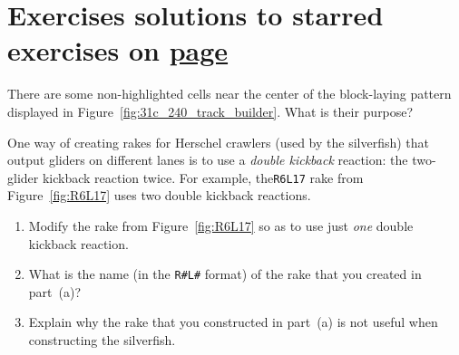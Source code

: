 \section*{Exercises \hfill \normalfont\textsf{\small solutions to starred exercises on \hyperlink{solutions_self_support_spaceships}{page \pageref{solutions_self_support_spaceships}}}}
\label{sec:solutions_self_support_spaceships}
\vspace*{-0.4cm}\hrulefill\vspace*{-0.3cm}\footnotesize\begin{multicols}{2}\vspace*{-0.4cm}\raggedcolumns{}
\setlength{\parskip}{0pt}


\begin{problem}\label{exer:self_support_spaceships_track_layer_rephaser}
	There are some non-highlighted cells near the center of the block-laying pattern displayed in Figure~\ref{fig:31c_240_track_builder}. What is their purpose?
\end{problem}


\mfilbreak


\begin{problemstar}\label{exer:self_support_spaceships_r4l1}
	One way of creating rakes for Herschel crawlers (used by the silverfish) that output gliders on different lanes is to use a \emph{double kickback} reaction: the two-glider kickback reaction twice. For example, the\texttt{R6L17} rake from Figure~\ref{fig:R6L17} uses two double kickback reactions.
	
	\begin{enumerate}[label=\bf\color{ocre}(\alph*)]
		\item Modify the rake from Figure~\ref{fig:R6L17} so as to use just \emph{one} double kickback reaction.
		
		\item What is the name (in the \texttt{R\#L\#} format) of the rake that you created in part~(a)?
		
		\item Explain why the rake that you constructed in part~(a) is not useful when constructing the silverfish.
	\end{enumerate}
\end{problemstar}



\end{multicols}
